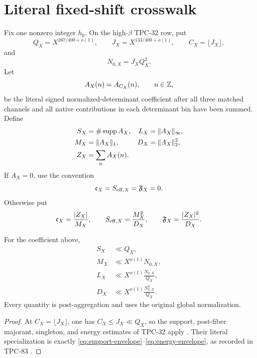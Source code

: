 \section{Literal fixed-shift crosswalk}
\label{sec:literal-crosswalk}

Fix one nonzero integer \(h_0\).  On the high-\(\beta\) TPC-32 row,
put
\begin{equation}
 Q_X=X^{267/400+o(1)},\qquad
 J_X=X^{133/400+o(1)},\qquad
 C_X=\lfloor J_X\rfloor,
\label{eq:critical-scales}
\end{equation}
and
\begin{equation}
 N_{0,X}=J_XQ_X^2.
\label{eq:N0}
\end{equation}
Let
\[
 A_X(n)=A_{C_X}(n),\qquad n\in\mathbb Z,
\]
be the literal signed normalized-determinant coefficient after all
three matched channels and all native contributions in each
determinant bin have been summed.  Define
\begin{equation}
\begin{aligned}
 S_X&=\#\operatorname{supp} A_X,&
 L_X&=\|A_X\|_\infty,\\
 M_X&=\|A_X\|_1,&
 D_X&=\|A_X\|_2^2,\\
 Z_X&=\sum_nA_X(n).
\end{aligned}
\label{eq:literal-statistics}
\end{equation}
If \(A_X=0\), use the convention
\[
 \mathfrak c_X=S_{\mathrm{eff},X}=\mathfrak F_X=0.
\]
Otherwise put
\begin{equation}
 \mathfrak c_X=\frac{|Z_X|}{M_X},\qquad
 S_{\mathrm{eff},X}=\frac{M_X^2}{D_X},\qquad
 \mathfrak F_X=\frac{|Z_X|^2}{D_X}.
\label{eq:literal-two-level}
\end{equation}

\begin{proposition}
\label{prop:tpc32-envelopes}
For the coefficient above,
\begin{align}
 S_X&\ll Q_X,\label{eq:support-envelope}\\
 M_X&\ll X^{o(1)}N_{0,X},\label{eq:mass-envelope}\\
 L_X&\ll X^{o(1)}\frac{N_{0,X}}{Q_X},
 \label{eq:atom-envelope}\\
 D_X&\ll X^{o(1)}\frac{N_{0,X}^2}{Q_X}.
 \label{eq:energy-envelope}
\end{align}
Every quantity is post-aggregation and uses the original global
normalization.
\end{proposition}

\begin{proof}
At \(C_X=\lfloor J_X\rfloor\), one has
\(C_X\le J_X\ll Q_X\), so the support, post-fiber majorant,
singleton, and energy estimates of TPC-32 apply
\citep{WangTPC32}.  Their literal specialization is exactly
\eqref{eq:support-envelope}--\eqref{eq:energy-envelope}, as recorded
in TPC-83 \citep{WangTPC83}.
\end{proof}

